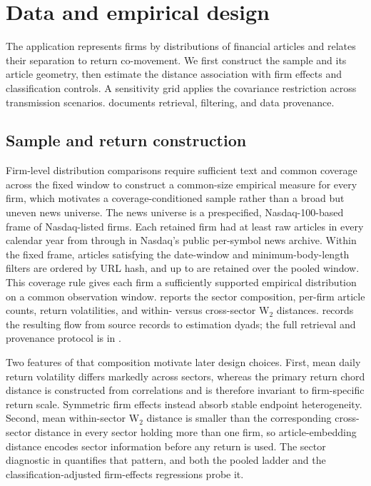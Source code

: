 \section{Data and empirical design}\label{sec:empirical-design}

The application represents firms by distributions of financial articles and
relates their separation to return co-movement.
We first construct the sample and its article geometry, then estimate the
distance association with firm effects and classification controls.
A sensitivity grid applies the covariance restriction across transmission scenarios.
 documents retrieval, filtering, and data provenance.

\subsection{Sample and return construction}\label{sec:sample-and-window}

Firm-level distribution comparisons require sufficient text and common
coverage across the fixed window to construct a common-size empirical measure
for every firm, which motivates a coverage-conditioned sample rather than a
broad but uneven news universe.
The news universe is a prespecified, Nasdaq-100-based frame of
 Nasdaq-listed firms.
Each retained firm had at least  raw articles
in every calendar year from
 through  in Nasdaq's
public per-symbol news archive.
Within the fixed frame, articles satisfying the date-window and
minimum-body-length filters are ordered by URL hash, and up to
 are retained over the pooled window.
This coverage rule gives each firm a sufficiently supported empirical
distribution on a common observation window.
 reports the sector composition,
per-firm article counts, return volatilities, and within- versus cross-sector
W$_2$ distances.
 records the resulting flow from source records to
estimation dyads; the full retrieval and provenance protocol is in
.



Two features of that composition motivate later design choices.
First, mean daily return volatility differs markedly across sectors, whereas
the primary return chord distance is constructed from correlations and is
therefore invariant to firm-specific return scale.
Symmetric firm effects instead absorb stable endpoint heterogeneity.
Second, mean within-sector W$_2$ distance is smaller than the corresponding
cross-sector distance in every sector holding more than one firm, so
article-embedding distance encodes sector information before any return is used.
The sector diagnostic in  quantifies that
pattern, and both the pooled ladder and the classification-adjusted
firm-effects regressions probe it.

